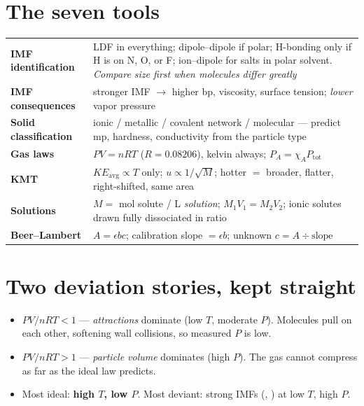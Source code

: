 \documentclass{apchem-worksheet}
\begin{document}
\apctitleblock

\section*{\sffamily The seven tools}

\renewcommand{\arraystretch}{1.45}
\noindent\begin{tabular}{@{}p{3.8cm}p{9.9cm}@{}}
\toprule
\textbf{IMF identification} & LDF in everything; dipole--dipole if polar;
  H-bonding only if H is on N, O, or F; ion--dipole for salts in polar
  solvent. \emph{Compare size first when molecules differ greatly}\\
\textbf{IMF consequences} & stronger IMF $\to$ higher bp, viscosity, surface
  tension; \emph{lower} vapor pressure\\
\textbf{Solid classification} & ionic / metallic / covalent network /
  molecular --- predict mp, hardness, conductivity from the particle type\\
\textbf{Gas laws} & $PV = nRT$ ($R = 0.08206$), kelvin always;
  $P_A = \chi_A P_{\text{tot}}$\\
\textbf{KMT} & $KE_{\text{avg}} \propto T$ only; $u \propto 1/\sqrt{M}$;
  hotter $=$ broader, flatter, right-shifted, same area\\
\textbf{Solutions} & $M = $ mol solute / L \emph{solution};
  $M_1V_1 = M_2V_2$; ionic solutes drawn fully dissociated in ratio\\
\textbf{Beer--Lambert} & $A = \epsilon bc$; calibration slope $= \epsilon b$;
  unknown $c = A \div \text{slope}$\\
\bottomrule
\end{tabular}

\section*{\sffamily Two deviation stories, kept straight}

\begin{itemize}[leftmargin=*,itemsep=0.2em]
  \item \textbf{$PV/nRT < 1$} --- \emph{attractions} dominate (low $T$,
        moderate $P$). Molecules pull on each other, softening wall
        collisions, so measured $P$ is low.
  \item \textbf{$PV/nRT > 1$} --- \emph{particle volume} dominates (high
        $P$). The gas cannot compress as far as the ideal law predicts.
  \item Most ideal: \textbf{high $T$, low $P$}. Most deviant: strong IMFs
        (, ) at low $T$, high $P$.
\end{itemize}
\end{document}
